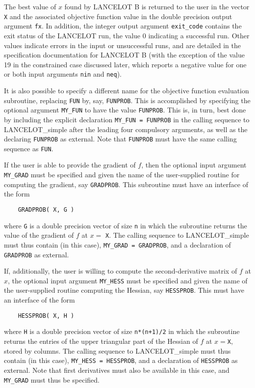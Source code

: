 \documentclass{article}
\begin{document}
The best value of $x$ found by {\sf LANCELOT B} is returned
to the user in the vector {\tt X} and the associated objective function value
in the double precision output argument {\tt fx}. In addition,
the integer output argument {\tt exit\_code} contains the exit status of the
{\sf LANCELOT} run, the value 0 indicating a successful run. Other values
indicate errors in the input or unsuccessful runs, and are detailed in the
specification documentation for {\sf LANCELOT B}
(with the exception of the value 19 in the constrained case discussed later,
which reports a negative value for one or both input arguments {\tt nin} and
{\tt neq}).

It is also possible to specify a different name for the objective function
evaluation subroutine, replacing {\tt FUN} by, say, {\tt FUNPROB}. This is
accomplished by specifying the optional argument {\tt MY\_FUN} to have the value
{\tt FUNPROB}. This is, in turn, best done by including the explicit
declaration {\tt MY\_FUN = FUNPROB} in the calling sequence to
{\sf LANCELOT\_simple} after the leading four compulsory arguments,
as well as the declaring {\tt FUNPROB} as external. Note that {\tt FUNPROB} must
have the same calling sequence as {\tt FUN}.

If the user is able to provide the gradient of $f$, then the optional input
argument {\tt MY\_GRAD} must be specified and given the name of the
user-supplied routine for computing the gradient, say {\tt GRADPROB}.
This subroutine must have an interface of the form

\begin{lstlisting}
    GRADPROB( X, G )
\end{lstlisting}
\noindent
where {\tt G} is a double precision vector of size {\tt n} in which the
subroutine returns the value of the gradient of $f$ at $x =$ {\tt X}. The
calling sequence to {\sf LANCELOT\_simple} must thus contain (in this case),
{\tt MY\_GRAD = GRADPROB}, and a declaration of {\tt GRADPROB} as external.

If, additionally, the user is willing to compute the second-derivative matrix
of $f$ at $x$, the optional input argument {\tt MY\_HESS} must be
specified and given the name of the user-supplied routine computing
the Hessian, say {\tt HESSPROB}. This must have an interface of the form

\begin{lstlisting}
    HESSPROB( X, H )
\end{lstlisting}
\noindent
where {\tt H} is a double precision vector of size {\tt n*(n+1)/2} in which the
subroutine returns the entries of the upper triangular part of the Hessian of
$f$ at $x=${\tt X}, stored by columns. The calling sequence to  {\sf
LANCELOT\_simple} must thus contain (in this case), {\tt MY\_HESS = HESSPROB},
and a declaration of {\tt HESSPROB} as external. Note that first derivatives
must also be available in this case, and {\tt MY\_GRAD} must thus be specified.
\end{document}
